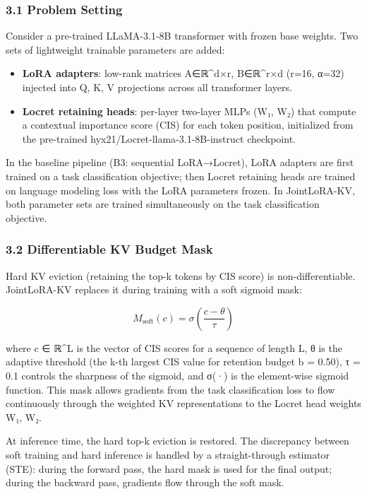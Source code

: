
\subsubsection{3.1 Problem Setting}

Consider a pre-trained LLaMA-3.1-8B transformer with frozen base weights. Two sets of lightweight trainable parameters are added:

\begin{itemize}
\item \textbf{LoRA adapters}: low-rank matrices A∈ℝ^{d×r}, B∈ℝ^{r×d} (r=16, α=32) injected into Q, K, V projections across all transformer layers.
\item \textbf{Locret retaining heads}: per-layer two-layer MLPs (W₁, W₂) that compute a contextual importance score (CIS) for each token position, initialized from the pre-trained hyx21/Locret-llama-3.1-8B-instruct checkpoint.
\end{itemize}

In the baseline pipeline (B3: sequential LoRA→Locret), LoRA adapters are first trained on a task classification objective; then Locret retaining heads are trained on language modeling loss with the LoRA parameters frozen. In JointLoRA-KV, both parameter sets are trained simultaneously on the task classification objective.

\subsubsection{3.2 Differentiable KV Budget Mask}

Hard KV eviction (retaining the top-k tokens by CIS score) is non-differentiable. JointLoRA-KV replaces it during training with a soft sigmoid mask:

$$M_{\text{soft}}(c) = \sigma\!\left(\frac{c - \theta}{\tau}\right)$$

where c ∈ ℝ^L is the vector of CIS scores for a sequence of length L, θ is the adaptive threshold (the k-th largest CIS value for retention budget b = 0.50), τ = 0.1 controls the sharpness of the sigmoid, and σ(·) is the element-wise sigmoid function. This mask allows gradients from the task classification loss to flow continuously through the weighted KV representations to the Locret head weights W₁, W₂.

At inference time, the hard top-k eviction is restored. The discrepancy between soft training and hard inference is handled by a straight-through estimator (STE): during the forward pass, the hard mask is used for the final output; during the backward pass, gradients flow through the soft mask.

